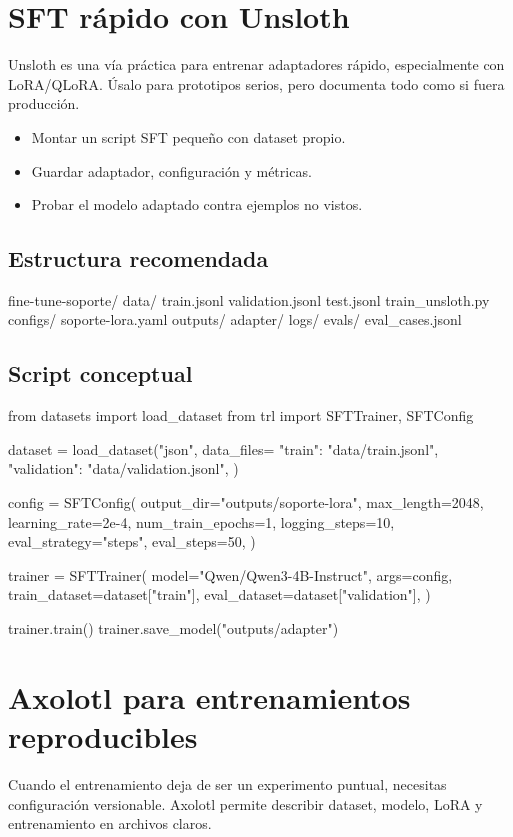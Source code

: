 \documentclass[11pt,a4paper]{book}
\begin{document}
\chapter{SFT rápido con Unsloth}
Unsloth es una vía práctica para entrenar adaptadores rápido, especialmente con LoRA/QLoRA. Úsalo para prototipos serios, pero documenta todo como si fuera producción.

\begin{itemize}\item Montar un script SFT pequeño con dataset propio.\end{itemize}
\begin{itemize}\item Guardar adaptador, configuración y métricas.\end{itemize}
\begin{itemize}\item Probar el modelo adaptado contra ejemplos no vistos.\end{itemize}
\section{Estructura recomendada}
\begin{codebox}
fine-tune-soporte/
  data/
    train.jsonl
    validation.jsonl
    test.jsonl
  train_unsloth.py
  configs/
    soporte-lora.yaml
  outputs/
    adapter/
    logs/
  evals/
    eval_cases.jsonl
\end{codebox}
\section{Script conceptual}
\begin{codebox}
from datasets import load_dataset
from trl import SFTTrainer, SFTConfig

dataset = load_dataset("json", data_files={
    "train": "data/train.jsonl",
    "validation": "data/validation.jsonl",
})

config = SFTConfig(
    output_dir="outputs/soporte-lora",
    max_length=2048,
    learning_rate=2e-4,
    num_train_epochs=1,
    logging_steps=10,
    eval_strategy="steps",
    eval_steps=50,
)

trainer = SFTTrainer(
    model="Qwen/Qwen3-4B-Instruct",
    args=config,
    train_dataset=dataset["train"],
    eval_dataset=dataset["validation"],
)

trainer.train()
trainer.save_model("outputs/adapter")
\end{codebox}
\chapter{Axolotl para entrenamientos reproducibles}
Cuando el entrenamiento deja de ser un experimento puntual, necesitas configuración versionable. Axolotl permite describir dataset, modelo, LoRA y entrenamiento en archivos claros.
\end{document}

